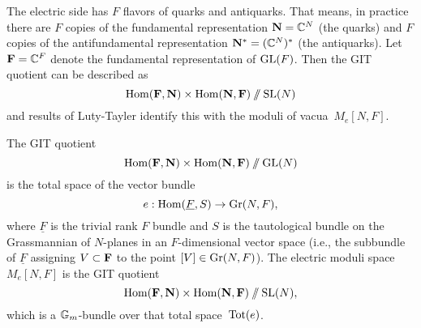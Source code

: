 \documentclass[11pt]{amsart}
\begin{document}
The electric side has $F$ flavors of quarks and antiquarks. 
That means, in practice there are $F$ copies of the fundamental representation $\mathbf N = \mathbb C^N$
(the quarks) 
and $F$ copies of the antifundamental representation $\mathbf N^* = (\mathbb C^N)^*$ (the antiquarks). 
Let $\mathbf F = \mathbb C^F$ denote the fundamental representation of $\operatorname{GL}(F)$.
Then the GIT quotient can be described as
\[
{\rm Hom}(\mathbf F, \mathbf N) \times {\rm Hom}(\mathbf N,\mathbf F)\mathbin{/\mkern-6mu/} \operatorname{SL}(N)
\]
and results of Luty-Tayler identify this with the moduli of vacua~$M_e[N,F]$.

\begin{prop}
The GIT quotient 
\[
{\rm Hom}(\mathbf F, \mathbf N) \times {\rm Hom}(\mathbf N,\mathbf F)\mathbin{/\mkern-6mu/} \operatorname{GL}(N)
\]
is the total space of the vector bundle
\[
e: {\rm Hom}(\underline{F}, S) \to {\rm Gr}(N,F),
\]
where $\underline{F}$ is the trivial rank $F$ bundle and $S$ is the tautological bundle on the Grassmannian of $N$-planes in an $F$-dimensional vector space
(i.e., the subbundle of $\underline{F}$ assigning $V \subset \mathbf F$ to the point $[V] \in {\rm Gr}(N,F)$).
The electric moduli space $M_e[N,F]$ is the GIT quotient 
\[
{\rm Hom}(\mathbf F, \mathbf N) \times {\rm Hom}(\mathbf N,\mathbf F)\mathbin{/\mkern-6mu/} \operatorname{SL}(N),
\]
which is a $\mathbb G_m$-bundle over that total space~$\operatorname{Tot}(e)$.
\end{prop}
\end{document}
